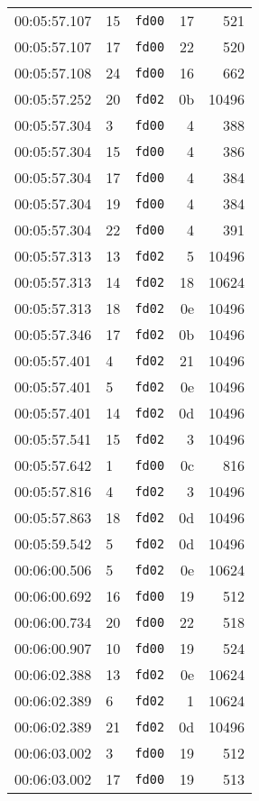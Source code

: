 \documentclass{article}
\begin{document}
\begin{longtable}{lllrr}
00:05:57.107 & 15 & \texttt{fd00} & 17 & 521 \\
00:05:57.107 & 17 & \texttt{fd00} & 22 & 520 \\
00:05:57.108 & 24 & \texttt{fd00} & 16 & 662 \\
00:05:57.252 & 20 & \texttt{fd02} & 0b & 10496 \\
00:05:57.304 & 3 & \texttt{fd00} & 4 & 388 \\
00:05:57.304 & 15 & \texttt{fd00} & 4 & 386 \\
00:05:57.304 & 17 & \texttt{fd00} & 4 & 384 \\
00:05:57.304 & 19 & \texttt{fd00} & 4 & 384 \\
00:05:57.304 & 22 & \texttt{fd00} & 4 & 391 \\
00:05:57.313 & 13 & \texttt{fd02} & 5 & 10496 \\
00:05:57.313 & 14 & \texttt{fd02} & 18 & 10624 \\
00:05:57.313 & 18 & \texttt{fd02} & 0e & 10496 \\
00:05:57.346 & 17 & \texttt{fd02} & 0b & 10496 \\
00:05:57.401 & 4 & \texttt{fd02} & 21 & 10496 \\
00:05:57.401 & 5 & \texttt{fd02} & 0e & 10496 \\
00:05:57.401 & 14 & \texttt{fd02} & 0d & 10496 \\
00:05:57.541 & 15 & \texttt{fd02} & 3 & 10496 \\
00:05:57.642 & 1 & \texttt{fd00} & 0c & 816 \\
00:05:57.816 & 4 & \texttt{fd02} & 3 & 10496 \\
00:05:57.863 & 18 & \texttt{fd02} & 0d & 10496 \\
00:05:59.542 & 5 & \texttt{fd02} & 0d & 10496 \\
00:06:00.506 & 5 & \texttt{fd02} & 0e & 10624 \\
00:06:00.692 & 16 & \texttt{fd00} & 19 & 512 \\
00:06:00.734 & 20 & \texttt{fd00} & 22 & 518 \\
00:06:00.907 & 10 & \texttt{fd00} & 19 & 524 \\
00:06:02.388 & 13 & \texttt{fd02} & 0e & 10624 \\
00:06:02.389 & 6 & \texttt{fd02} & 1 & 10624 \\
00:06:02.389 & 21 & \texttt{fd02} & 0d & 10496 \\
00:06:03.002 & 3 & \texttt{fd00} & 19 & 512 \\
00:06:03.002 & 17 & \texttt{fd00} & 19 & 513 \\

\end{longtable}
\end{document}
